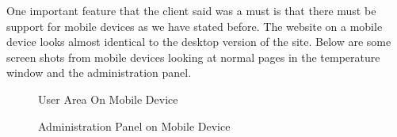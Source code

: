 \documentclass{report}
\begin{document}
\indent
One important feature that the client said was a must is that there must be support for mobile devices as we have stated before. The website on a mobile device looks almost identical to the desktop version of the site. Below are some screen shots from mobile devices looking at normal pages in the temperature window and the administration panel.
\begin{figure}[H]
	\caption{User Area On Mobile Device}
\end{figure}
\begin{figure}[H]
	\caption{Administration Panel on Mobile Device}
\end{figure}
\newpage
\end{document}
